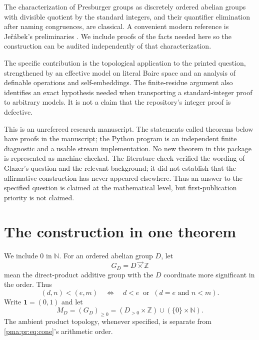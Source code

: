 \documentclass[11pt]{article}
\numberwithin{equation}{section}
\theoremstyle{definition}
\theoremstyle{remark}
\newcommand{\N}{\mathbb N}
\newcommand{\Z}{\mathbb Z}
\newcommand{\lex}{\mathbin{\overrightarrow\times}}
\newcommand{\GD}{G_D}
\newcommand{\MD}{M_D}
\newcommand{\one}{\mathbf 1}
\begin{document}
The characterization of Presburger groups as discretely ordered abelian
groups with divisible quotient by the standard integers, and their
quantifier elimination after naming congruences, are classical. A convenient
modern reference is Je\v r\'abek's preliminaries \cite[Section 2]{jerabek}.
We include proofs of the facts needed here so the construction can be
audited independently of that characterization.

The specific contribution is the topological application to the printed
question, strengthened by an effective model on literal Baire space and an
analysis of definable operations and self-embeddings. The finite-residue
argument also identifies an exact hypothesis needed when transporting a
standard-integer proof to arbitrary models. It is not a claim that the
repository's integer proof is defective.

This is an unrefereed research manuscript. The statements called theorems
below have proofs in the manuscript; the Python program is an independent
finite diagnostic and a usable stream implementation. No new theorem in
this package is represented as machine-checked. The literature check
verified the wording of Glazer's question and the relevant background; it
did not establish that the affirmative construction has never appeared
elsewhere. Thus an answer to the specified question is claimed at the
mathematical level, but first-publication priority is not claimed.

\section{The construction in one theorem}
\label{pma:pr:sec:main}

We include $0$ in $\N$. For an ordered abelian group $D$, let
\[
 \GD=D\lex\Z
\]
mean the direct-product additive group with the $D$ coordinate more
significant in the order. Thus
\begin{equation}
 (d,n)<(e,m)
 \quad\Longleftrightarrow\quad
 d<e\ \text{ or }\ (d=e\text{ and }n<m).
 \label{pma:pr:eq:lex}
\end{equation}
Write $\one=(0,1)$ and let
\begin{equation}
 \MD=(\GD)_{\geq0}
      =(D_{>0}\times\Z)\cup(\{0\}\times\N).
 \label{pma:pr:eq:cone}
\end{equation}
The ambient product topology, whenever specified, is separate from
\eqref{pma:pr:eq:cone}'s arithmetic order.
\end{document}
